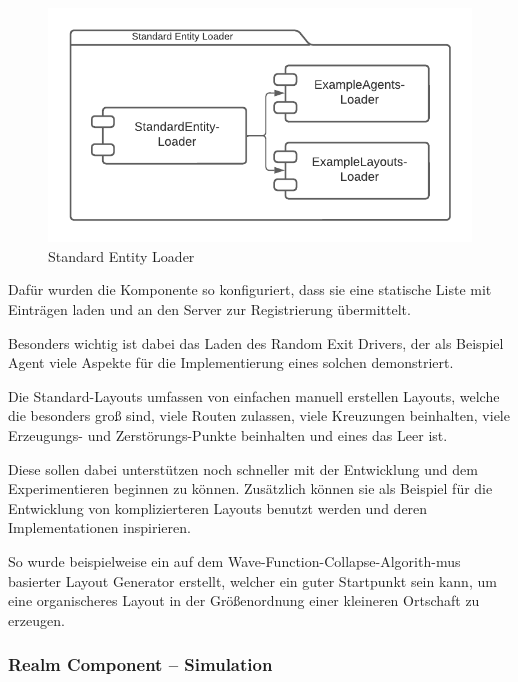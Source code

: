 \begin{figure}[htb]
    \centering
    \includegraphics[scale=.65,center]{medien/standard-entity-loader.pdf}
    \caption{Standard Entity Loader}
    \ownsource
    \label{fig:standard-entity-loader}
\end{figure}

\FloatBarrier

Dafür wurden die Komponente so konfiguriert, dass sie eine statische Liste mit Einträgen laden und an den Server zur Registrierung übermittelt.

Besonders wichtig ist dabei das Laden des Random Exit Drivers, der als Beispiel Agent viele Aspekte für die Implementierung eines solchen demonstriert.

Die Standard-Layouts umfassen von einfachen manuell erstellen Layouts, welche die besonders groß sind, viele Routen zulassen, viele Kreuzungen beinhalten, viele Erzeugungs- und Zerstörungs-Punkte beinhalten und eines das Leer ist.

Diese sollen dabei unterstützen noch schneller mit der Entwicklung und dem Experimentieren beginnen zu können.
Zusätzlich können sie als Beispiel für die Entwicklung von komplizierteren Layouts benutzt werden und deren Implementationen inspirieren.

So wurde beispielweise ein auf dem Wave-Function-Collapse-Algorith-\linebreak mus\autocite{wfca2019} basierter Layout Generator erstellt, welcher ein guter Startpunkt sein kann, um eine organischeres Layout in der Größenordnung einer kleineren Ortschaft zu erzeugen.

\subsubsection{Realm Component – Simulation}

